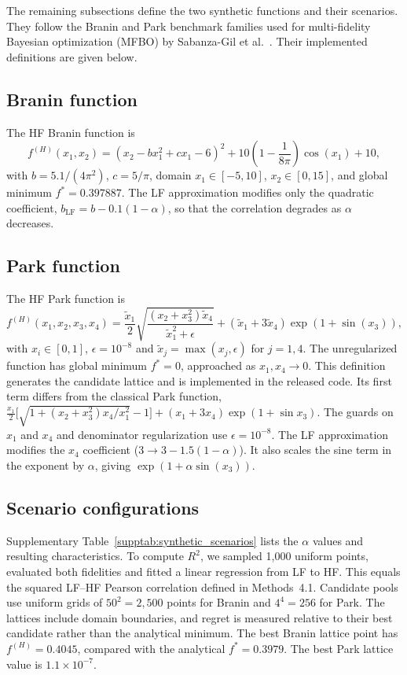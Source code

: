 The remaining subsections define the two synthetic functions and their scenarios. They follow the Branin and Park benchmark families used for multi-fidelity Bayesian optimization (MFBO) by Sabanza-Gil et al.~\citep{sabanza2025best}. Their implemented definitions are given below.

\subsection{Branin function}
The HF Branin function is
\begin{equation}
f^{(H)}(x_1, x_2) = \left(x_2 - b x_1^2 + c x_1 - 6\right)^2 + 10\left(1 - \frac{1}{8\pi}\right)\cos(x_1) + 10,
\end{equation}
with $b = 5.1/(4\pi^2)$, $c = 5/\pi$, domain $x_1 \in [-5, 10]$, $x_2 \in [0, 15]$, and
global minimum $f^* = 0.397887$. The LF approximation modifies only the
quadratic coefficient, $b_{\text{LF}} = b - 0.1(1-\alpha)$, so that the correlation
degrades as $\alpha$ decreases.

\subsection{Park function}
The HF Park function is
\begin{equation}
f^{(H)}(x_1, x_2, x_3, x_4) = \frac{\tilde{x}_1}{2}\sqrt{\frac{(x_2 + x_3^2)\tilde{x}_4}{\tilde{x}_1^2 + \epsilon}} + (\tilde{x}_1 + 3\tilde{x}_4)\exp\!\left(1 + \sin(x_3)\right),
\end{equation}
with $x_i \in [0,1]$, $\epsilon = 10^{-8}$ and $\tilde{x}_j = \max(x_j,\epsilon)$ for $j=1,4$. The unregularized function has global minimum $f^* = 0$, approached as $x_1, x_4 \to 0$. This definition generates the candidate lattice and is implemented in the released code. Its first term differs from the classical Park function, $\tfrac{x_1}{2}\bigl[\sqrt{1 + (x_2 + x_3^2)x_4/x_1^2} - 1\bigr] + (x_1 + 3x_4)\exp(1 + \sin x_3)$. The guards on $x_1$ and $x_4$ and denominator regularization use $\epsilon = 10^{-8}$. The LF approximation modifies the $x_4$ coefficient ($3 \rightarrow 3 - 1.5(1-\alpha)$). It also scales the sine term in the exponent by $\alpha$, giving $\exp(1 + \alpha\sin(x_3))$.

\subsection{Scenario configurations}
Supplementary Table~\ref{supptab:synthetic_scenarios} lists the $\alpha$ values and resulting characteristics. To compute $R^2$, we sampled 1,000 uniform points, evaluated both fidelities and fitted a linear regression from LF to HF. This equals the squared LF--HF Pearson correlation defined in Methods~4.1. Candidate pools use uniform grids of $50^2 = 2{,}500$ points for Branin and $4^4 = 256$ for Park. The lattices include domain boundaries, and regret is measured relative to their best candidate rather than the analytical minimum. The best Branin lattice point has $f^{(H)} = 0.4045$, compared with the analytical $f^* = 0.3979$. The best Park lattice value is $1.1 \times 10^{-7}$.

